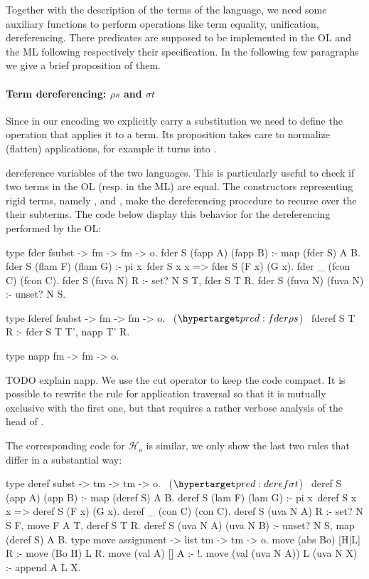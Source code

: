 \documentclass[sigconf,natbib=false,review]{acmart}
\newcommand{\Ho}{\ensuremath{\mathcal{H}_o}\xspace}
\begin{document}
Together with the description of the terms of the language, we need some
auxiliary functions to perform operations like term equality, unification,
dereferencing. There predicates are supposed to be implemented in the OL and the
ML following respectively their specification. In the following few paragraphs
we give a brief proposition of them.

\paragraph{Term dereferencing: $\rho s$ and $\sigma t$}

Since in our encoding we explicitly carry a substitution we need to
define the operation that applies it to a term. Its proposition
takes care to normalize (flatten) applications, for example
it turns
into
.


dereference variables of the two languages. This is particularly useful to check
if two terms in the OL (resp. in the ML) are equal. The constructors
representing rigid terms, namely ,  and ,
make the dereferencing procedure to recurse over the their subterms. The code
below display this behavior for the dereferencing performed by the OL:

\begin{elpicode}
type fder fsubst -> fm -> fm -> o.
fder S (fapp A) (fapp B) :- map (fder S) A B.
fder S (flam F) (flam G) :- 
  pi x\ fder S x x => fder S (F x) (G x).
fder _ (fcon C) (fcon C).
fder S (fuva N) R :- set? N S T, fder S T R.
fder S (fuva N) (fuva N) :- unset? N S.

type fderef fsubst -> fm -> fm -> o.                 ~($\customlabel{pred:fder}{\rho s}$)~
fderef S T R :- fder S T T', napp T' R.

type napp fm -> fm -> o.
\end{elpicode}

\noindent
TODO explain napp.
We use the cut operator to keep the code compact. It is possible to rewrite
the rule for application traversal so that it is mutually exclusive with the
first one, but that requires a rather verbose analysis of the head of .

The corresponding code for \Ho is similar, we only show the last two rules that
differ in a substantial way:

\begin{elpicode}
type deref subst -> tm -> tm -> o.                   ~($\customlabel{pred:deref}{\sigma t}$)~
deref S (app A) (app B) :- map (deref S) A B.
deref S (lam F) (lam G) :- 
  pi x\ deref S x x => deref S (F x) (G x).
deref _ (con C) (con C).
deref S (uva N A) R :- set? N S F, move F A T, deref S T R.
deref S (uva N A) (uva N B) :- unset? N S, map (deref S) A B.
type move assignment -> list tm -> tm -> o.
move (abs Bo)        [H|L] R :- move (Bo H) L R.
move (val A)         []    A :- !.
move (val (uva N A)) L     (uva N X) :- append A L X.
\end{elpicode}
\end{document}
